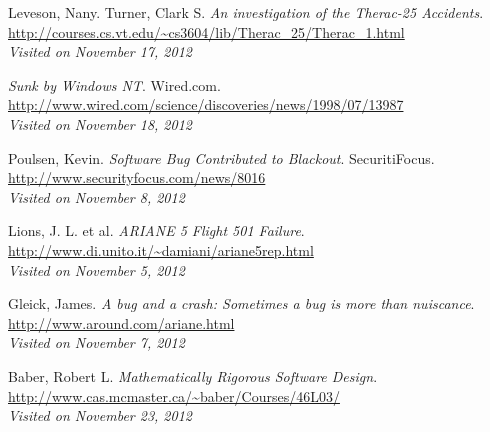 \documentclass[11pt]{article}
\begin{document}
\newpage
\begin{thebibliography}{99}
    Leveson, Nany. Turner, Clark S. \emph{An investigation of the Therac-25 Accidents}.\\
    \url{http://courses.cs.vt.edu/~cs3604/lib/Therac_25/Therac_1.html}\\
    \emph{Visited on November 17, 2012}

    \emph{Sunk by Windows NT}. Wired.com.\\
    \url{http://www.wired.com/science/discoveries/news/1998/07/13987}\\
    \emph{Visited on November 18, 2012}

    Poulsen, Kevin. \emph{Software Bug Contributed to Blackout}. SecuritiFocus.\\
    \url{http://www.securityfocus.com/news/8016}\\
    \emph{Visited on November 8, 2012}

    Lions, J. L. et al. \emph{ARIANE 5 Flight 501 Failure}.\\
    \url{http://www.di.unito.it/~damiani/ariane5rep.html}\\
    \emph{Visited on November 5, 2012}

    Gleick, James. \emph{A bug and a crash: Sometimes a bug is more than nuiscance}.
    \url{http://www.around.com/ariane.html}\\
    \emph{Visited on November 7, 2012}

    Baber, Robert L. \emph{Mathematically Rigorous Software Design}.\\
    \url{http://www.cas.mcmaster.ca/~baber/Courses/46L03/}\\
    \emph{Visited on November 23, 2012} \end{thebibliography}
\end{document}
